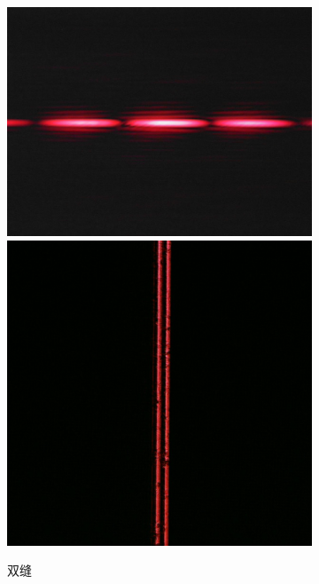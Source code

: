 \documentclass[a4paper]{article}
\begin{document}
\begin{figure}[htbp]
\begin{subfigure}[htbp]{0.3\textwidth}
        \centering
        \includegraphics[width=\textwidth]{fre-done/2-8.JPG}
        \includegraphics[width=\textwidth]{img-done/2-8.JPG}
        \caption{双缝}
        \label{2-8}
    \end{subfigure}
    \begin{subfigure}[htbp]{0.3\textwidth}
        \centering

\end{subfigure}
\end{figure}
\end{document}
